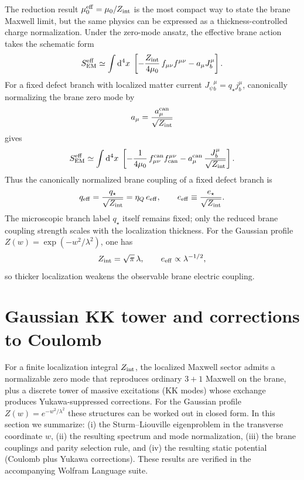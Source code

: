 \documentclass[11pt]{article}
\newcommand{\dd}{\mathrm d}
\newcommand{\J}{J}
\newcommand{\Z}{Z}
\newcommand{\lam}{\lambda}      %
\newcommand{\Zint}{Z_{\rm int}} %
\newcommand{\etaQ}{\eta_Q}
\newcommand{\estar}{e_\star}
\newcommand{\qstar}{q_\star}
\newcommand{\eeff}{e_{\rm eff}}
\newcommand{\qeff}{q_{\rm eff}}
\newcommand{\Jpsi}{J_\psi}
\newcommand{\muo}{\mu_0}
\newcommand{\mueff}{\mu_0^{\rm eff}}
\begin{document}
The reduction result \(\mueff=\muo/\Zint\) is the most compact way to state the
brane Maxwell limit, but the same physics can be expressed as a
thickness-controlled charge normalization. Under the zero-mode ansatz, the
effective brane action takes the schematic form
\begin{equation}
  S_{\rm EM}^{\rm eff}
  \simeq \int \dd^4x\;
  \left[
    -\frac{\Zint}{4\muo}\,f_{\mu\nu}f^{\mu\nu}
    - a_\mu \J_b^\mu
  \right].
\end{equation}
For a fixed defect branch with localized matter current
\(\Jpsi{}_b^\mu=\qstar j_b^\mu\), canonically normalizing the brane zero mode by
\begin{equation}
  a_\mu = \frac{a_\mu^{\rm can}}{\sqrt{\Zint}}
\end{equation}
gives
\begin{equation}
  S_{\rm EM}^{\rm eff}
  \simeq \int \dd^4x\;
  \left[
    -\frac{1}{4\muo}\,f_{\mu\nu}^{\rm can}f_{\rm can}^{\mu\nu}
    - a_\mu^{\rm can}\,\frac{\J_b^\mu}{\sqrt{\Zint}}
  \right].
\end{equation}
Thus the canonically normalized brane coupling of a fixed defect branch is
\begin{equation}
  \qeff=\frac{\qstar}{\sqrt{\Zint}}=\etaQ\,\eeff,
  \qquad
  \eeff\equiv \frac{\estar}{\sqrt{\Zint}}.
  \label{eq:qeff_canonical}
\end{equation}
The microscopic branch label \(\qstar\) itself remains fixed; only the reduced
brane coupling strength scales with the localization thickness. For the Gaussian
profile \(\Z(w)=\exp(-w^2/\lam^2)\), one has
\begin{equation}
  \Zint=\sqrt{\pi}\,\lam,
  \qquad
  \eeff\propto \lam^{-1/2},
\end{equation}
so thicker localization weakens the observable brane electric coupling.

\section{Gaussian KK tower and corrections to Coulomb}
\label{sec:kk_coulomb}

For a finite localization integral \(\Zint\), the localized Maxwell sector admits a
normalizable zero mode that reproduces ordinary \(3+1\) Maxwell on the brane, plus
a discrete tower of massive excitations (KK modes) whose exchange produces
Yukawa-suppressed corrections. For the Gaussian profile \(\Z(w)=e^{-w^2/\lam^2}\)
these structures can be worked out in closed form. In this section we summarize:
(i) the Sturm--Liouville eigenproblem in the transverse coordinate \(w\), (ii) the
resulting spectrum and mode normalization, (iii) the brane couplings and parity
selection rule, and (iv) the resulting static potential (Coulomb plus Yukawa
corrections). These results are verified in the accompanying Wolfram Language
suite.
\end{document}
